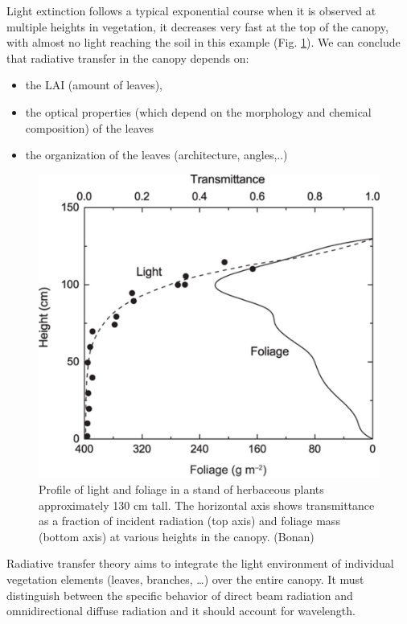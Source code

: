 \documentclass[12pt,oneside]{book}
\providecommand{\tightlist}{%
  \setlength{\itemsep}{0pt}\setlength{\parskip}{0pt}}
\begin{document}
Light extinction follows a typical exponential course when it is
observed at multiple heights in vegetation, it decreases very fast at
the top of the canopy, with almost no light reaching the soil in this
example (Fig. \ref{fig:f36}). We can conclude that radiative transfer in
the canopy depends on:

\begin{itemize}
\tightlist
\item
  the LAI (amount of leaves),
\item
  the optical properties (which depend on the morphology and chemical
  composition) of the leaves
\item
  the organization of the leaves (architecture, angles,..)
\end{itemize}

\begin{figure}

{\centering \includegraphics[width=0.8\linewidth]{figures/chap3/f36_obs_profile} 

}

\caption{Profile of light and foliage in a stand of herbaceous plants approximately 130 cm tall. The horizontal axis shows transmittance as a fraction of incident radiation (top axis) and foliage mass (bottom axis) at various heights in the canopy. (Bonan)}\label{fig:f36}
\end{figure}

Radiative transfer theory aims to integrate the light environment of
individual vegetation elements (leaves, branches, \ldots{}) over the
entire canopy. It must distinguish between the specific behavior of
direct beam radiation and omnidirectional diffuse radiation and it
should account for wavelength.
\end{document}

